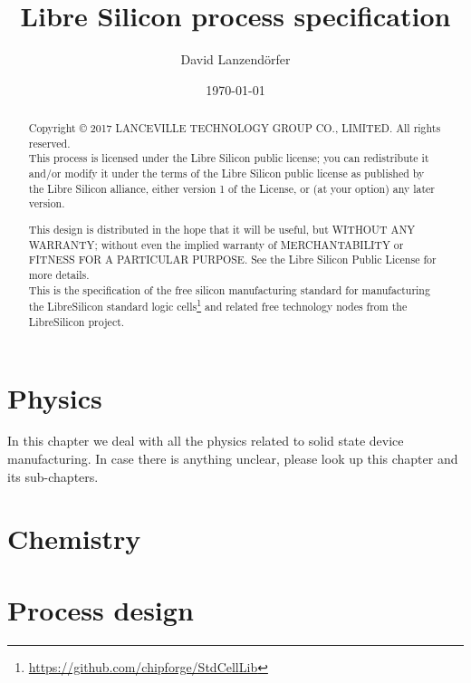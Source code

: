 \documentclass[10pt,a4paper,oneside]{article}
\title{Libre Silicon process specification}
\date{\today}
\author{David Lanzendörfer}
\newcounter{ct}
\begin{document}
\maketitle

\begin{abstract}
	Copyright © 2017 LANCEVILLE TECHNOLOGY GROUP CO., LIMITED. All rights reserved. \\

	This process is licensed under the Libre Silicon public license; you can redistribute it and/or modify it under the terms of the Libre Silicon public license
	as published by the Libre Silicon alliance, either version 1 of the License, or (at your option) any later version.

	This design is distributed in the hope that it will be useful, but WITHOUT ANY WARRANTY; without even the implied warranty of MERCHANTABILITY or FITNESS FOR A PARTICULAR PURPOSE.
	See the Libre Silicon Public License for more details. \\

	This is the specification of the free silicon manufacturing standard for manufacturing the LibreSilicon standard logic cells\footnote{\url{https://github.com/chipforge/StdCellLib}} and related free technology nodes from the LibreSilicon project.
\end{abstract}

\newpage
\tableofcontents
\newpage

\newpage
\section{Physics}
In this chapter we deal with all the physics related to solid state device manufacturing.
In case there is anything unclear, please look up this chapter and its sub-chapters.

\newpage

\newpage


\newpage



\newpage
\section{Chemistry}


\newpage
\section{Process design}

\newpage







\newpage
\end{document}
